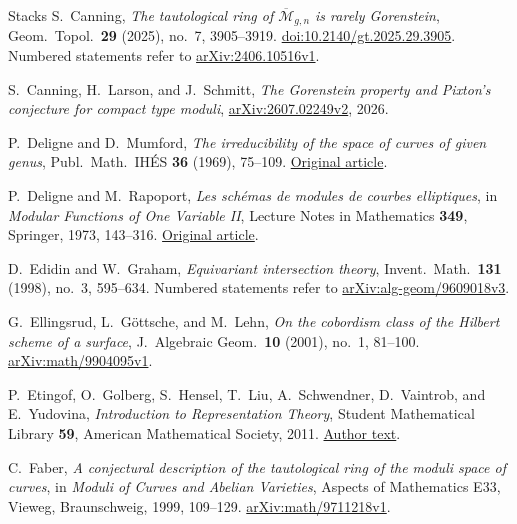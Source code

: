 \begin{thebibliography}{Stacks}
S.~Canning,
\emph{The tautological ring of $\overline{\mathcal M}_{g,n}$ is rarely Gorenstein},
Geom.\ Topol.\ \textbf{29} (2025), no.~7, 3905--3919.
\href{https://doi.org/10.2140/gt.2025.29.3905}{doi:10.2140/gt.2025.29.3905}.
Numbered statements refer to
\href{https://arxiv.org/abs/2406.10516v1}{arXiv:2406.10516v1}.

S.~Canning, H.~Larson, and J.~Schmitt,
\emph{The Gorenstein property and Pixton's conjecture for compact type moduli},
\href{https://arxiv.org/abs/2607.02249v2}{arXiv:2607.02249v2}, 2026.

P.~Deligne and D.~Mumford,
\emph{The irreducibility of the space of curves of given genus},
Publ.\ Math.\ IH\'ES \textbf{36} (1969), 75--109.
\href{https://www.numdam.org/item/PMIHES_1969__36__75_0.pdf}{Original article}.

P.~Deligne and M.~Rapoport,
\emph{Les sch\'emas de modules de courbes elliptiques},
in \emph{Modular Functions of One Variable II},
Lecture Notes in Mathematics \textbf{349}, Springer, 1973, 143--316.
\href{https://publications.ias.edu/sites/default/files/Number22.pdf}{Original article}.

D.~Edidin and W.~Graham,
\emph{Equivariant intersection theory},
Invent.\ Math.\ \textbf{131} (1998), no.~3, 595--634.
Numbered statements refer to
\href{https://arxiv.org/abs/alg-geom/9609018v3}{arXiv:alg-geom/9609018v3}.

G.~Ellingsrud, L.~G\"ottsche, and M.~Lehn,
\emph{On the cobordism class of the Hilbert scheme of a surface},
J.\ Algebraic Geom.\ \textbf{10} (2001), no.~1, 81--100.
\href{https://arxiv.org/abs/math/9904095v1}{arXiv:math/9904095v1}.

P.~Etingof, O.~Golberg, S.~Hensel, T.~Liu, A.~Schwendner,
D.~Vaintrob, and E.~Yudovina,
\emph{Introduction to Representation Theory},
Student Mathematical Library \textbf{59}, American Mathematical Society, 2011.
\href{https://math.mit.edu/~etingof/representationtheorybook.pdf}{Author text}.

C.~Faber,
\emph{A conjectural description of the tautological ring of the moduli space of curves},
in \emph{Moduli of Curves and Abelian Varieties},
Aspects of Mathematics E33, Vieweg, Braunschweig, 1999, 109--129.
\href{https://arxiv.org/abs/math/9711218v1}{arXiv:math/9711218v1}.


\end{thebibliography}
